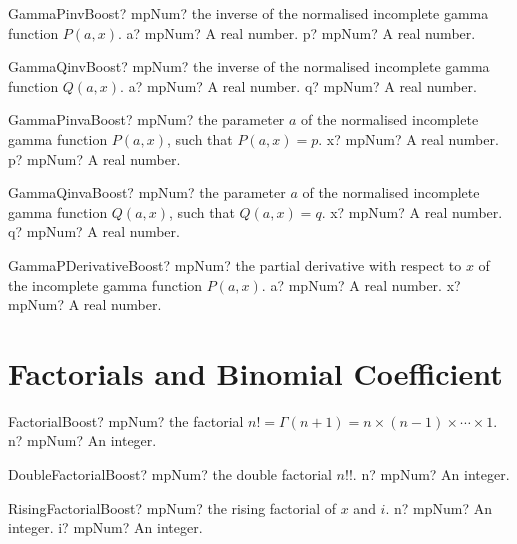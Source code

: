 \documentclass[12pt,a4paper,openany]{book}
\begin{document}
\begin{mpFunctionsExtract}
\mpFunctionTwo
{GammaPinvBoost? mpNum? the inverse of the normalised incomplete gamma function $P(a,x)$.}
{a? mpNum? A real number.}
{p? mpNum? A real number.}
\end{mpFunctionsExtract}

\begin{mpFunctionsExtract}
\mpFunctionTwo
{GammaQinvBoost? mpNum? the inverse of the normalised incomplete gamma function $Q(a,x)$.}
{a? mpNum? A real number.}
{q? mpNum? A real number.}
\end{mpFunctionsExtract}

\begin{mpFunctionsExtract}
\mpFunctionTwo
{GammaPinvaBoost? mpNum? the parameter $a$ of the normalised incomplete gamma function $P(a,x)$, such that $P(a,x) = p$.}
{x? mpNum? A real number.}
{p? mpNum? A real number.}
\end{mpFunctionsExtract}

\begin{mpFunctionsExtract}
\mpFunctionTwo
{GammaQinvaBoost? mpNum? the parameter $a$ of the normalised incomplete gamma function $Q(a,x)$, such that $Q(a,x) = q$.}
{x? mpNum? A real number.}
{q? mpNum? A real number.}
\end{mpFunctionsExtract}

\begin{mpFunctionsExtract}
\mpFunctionTwo
{GammaPDerivativeBoost? mpNum? the partial derivative with respect to $x$ of the incomplete gamma function $P(a,x)$.}
{a? mpNum? A real number.}
{x? mpNum? A real number.}
\end{mpFunctionsExtract}

\section{Factorials and Binomial Coefficient}

\begin{mpFunctionsExtract}
\mpFunctionOne
{FactorialBoost? mpNum? the factorial $n! = \Gamma(n+1) = n \times (n-1) \times \cdots \times 1$.}
{n? mpNum? An integer.}
\end{mpFunctionsExtract}

\begin{mpFunctionsExtract}
\mpFunctionOne
{DoubleFactorialBoost? mpNum? the double factorial $n!!$.}
{n? mpNum? An integer.}
\end{mpFunctionsExtract}

\begin{mpFunctionsExtract}
\mpFunctionTwo
{RisingFactorialBoost? mpNum? the rising factorial of $x$ and $i$.}
{n? mpNum? An integer.}
{i? mpNum? An integer.}
\end{mpFunctionsExtract}
\end{document}
